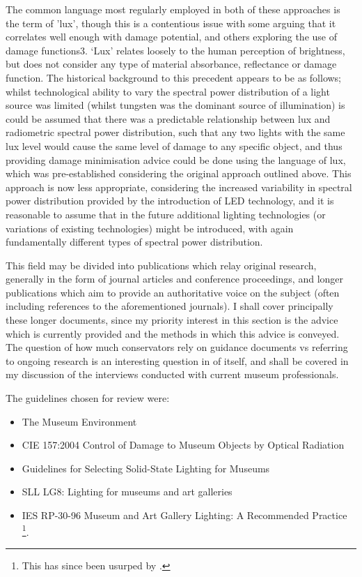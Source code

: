 The common language most regularly employed in both of these approaches is the term of 'lux', though this is a contentious issue with some arguing that it correlates well enough with damage potential, and others exploring the use of damage functions3. ‘Lux’ relates loosely to the human perception of brightness, but does not consider any type of material absorbance, reflectance or damage function. The historical background to this precedent appears to be as follows; whilst technological ability to vary the spectral power distribution of a light source was limited (whilst tungsten was the dominant source of illumination) is could be assumed that there was a predictable relationship between lux and radiometric spectral power distribution, such that any two lights with the same lux level would cause the same level of damage to any specific object, and thus providing damage minimisation advice could be done using the language of lux, which was pre-established considering the original approach outlined above. This approach is now less appropriate, considering the increased variability in spectral power distribution provided by the introduction of LED technology, and it is reasonable to assume that in the future additional lighting technologies (or variations of existing technologies) might be introduced, with again fundamentally different types of spectral power distribution.

This field may be divided into publications which relay original research, generally in the form of journal articles and conference proceedings, and longer publications which aim to provide an authoritative voice on the subject (often including references to the aforementioned journals). I shall cover principally these longer documents, since my priority interest in this section is the advice which is currently provided and the methods in which this advice is conveyed. The question of how much conservators rely on guidance documents vs referring to ongoing research is an interesting question in of itself, and shall be covered in my discussion of the interviews conducted with current museum professionals.

\noindent
The guidelines chosen for review were:
\begin{itemize}
\item The Museum Environment \citep{thomson_museum_1986}
\item \gls{CIE} 157:2004 Control of Damage to Museum Objects by Optical Radiation \citep{cie_cie_2004}
\item Guidelines for Selecting Solid-State Lighting for Museums \citep{druzik_guidelines_2012}
\item SLL LG8: Lighting for museums and art galleries \citep{cibse_lighting_2015}
\item IES RP-30-96 Museum and Art Gallery Lighting: A Recommended Practice \citep{ies_ies_1996}\footnote{This has since been usurped by \citet{illuminating_engineering_society_ies_2017}.}.
\end{itemize}


